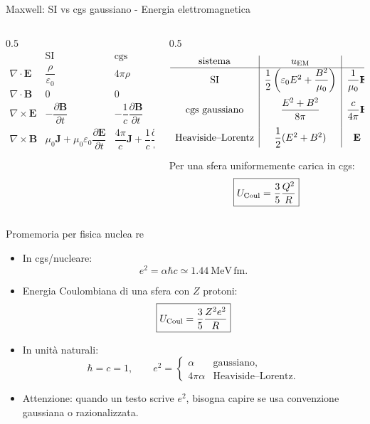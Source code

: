 \begin{frame}{Maxwell: SI vs cgs gaussiano - Energia elettromagnetica}
    \begin{columns}[T]
        \begin{column}{0.5\textwidth}
\small
\[
\begin{array}{c|c|c}
 & \text{SI} & \text{cgs gaussiano} \\ \hline
\nabla\cdot\mathbf E &
\dfrac{\rho}{\varepsilon_0} &
4\pi\rho
\\[3mm]
\nabla\cdot\mathbf B &
0 & 0
\\[2mm]
\nabla\times\mathbf E &
-\dfrac{\partial\mathbf B}{\partial t} &
-\dfrac1c\dfrac{\partial\mathbf B}{\partial t}
\\[3mm]
\nabla\times\mathbf B &
\mu_0\mathbf J+\mu_0\varepsilon_0
\dfrac{\partial\mathbf E}{\partial t}
&
\dfrac{4\pi}{c}\mathbf J+
\dfrac1c\dfrac{\partial\mathbf E}{\partial t}
\end{array}
\]
        \end{column}
        \begin{column}{0.5\textwidth}
\small
\[
\begin{array}{c|c|c}
\text{sistema} & u_{\rm EM} & \mathbf S \\ \hline
\text{SI} &
\dfrac12\left(\varepsilon_0E^2+\dfrac{B^2}{\mu_0}\right)
&
\dfrac1{\mu_0}\mathbf E\times\mathbf B
\\[4mm]
\text{cgs gaussiano} &
\dfrac{E^2+B^2}{8\pi}
&
\dfrac{c}{4\pi}\mathbf E\times\mathbf B
\\[4mm]
\text{Heaviside--Lorentz} &
\dfrac12(E^2+B^2)
&
\mathbf E\times\mathbf B
\end{array}
\]

Per una sfera uniformemente carica in cgs:
\[
\boxed{
U_{\rm Coul}=\frac35\frac{Q^2}{R}
}
\]
            
        \end{column}
    \end{columns}
    
\end{frame}

\begin{frame}{Promemoria per fisica nuclea re}
\small
\begin{itemize}
  \item In cgs/nucleare:
  \[
  e^2=\alpha\hbar c\simeq1.44\ \mathrm{MeV\,fm}.
  \]

  \item Energia Coulombiana di una sfera con \(Z\) protoni:
  \[
  \boxed{
  U_{\rm Coul}
  =
  \frac35\frac{Z^2e^2}{R}
  }
  \]

  \item In unità naturali:
  \[
  \hbar=c=1,
  \qquad
  e^2=
  \begin{cases}
  \alpha & \text{gaussiano},\\
  4\pi\alpha & \text{Heaviside--Lorentz}.
  \end{cases}
  \]

  \item Attenzione: quando un testo scrive \(e^2\), bisogna capire
  se usa convenzione gaussiana o razionalizzata.
\end{itemize}
\end{frame}


